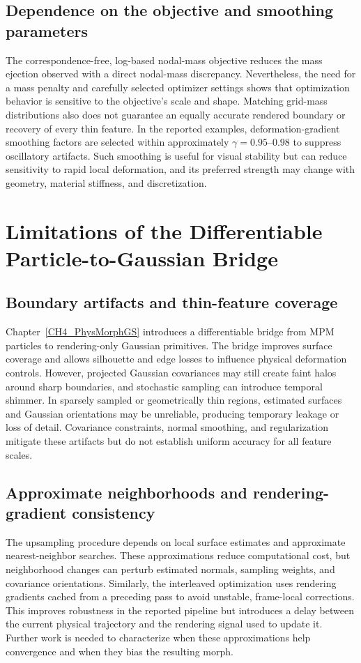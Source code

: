 \subsection{Dependence on the objective and smoothing parameters}
The correspondence-free, log-based nodal-mass objective reduces the mass ejection observed with a direct nodal-mass discrepancy. Nevertheless, the need for a mass penalty and carefully selected optimizer settings shows that optimization behavior is sensitive to the objective's scale and shape. Matching grid-mass distributions also does not guarantee an equally accurate rendered boundary or recovery of every thin feature. In the reported examples, deformation-gradient smoothing factors are selected within approximately $\gamma=0.95$--$0.98$ to suppress oscillatory artifacts. Such smoothing is useful for visual stability but can reduce sensitivity to rapid local deformation, and its preferred strength may change with geometry, material stiffness, and discretization.

\section{Limitations of the Differentiable Particle-to-Gaussian Bridge}
\label{subsec:lim-bridge}

\subsection{Boundary artifacts and thin-feature coverage}
Chapter~\ref{CH4_PhysMorphGS} introduces a differentiable bridge from MPM particles to rendering-only Gaussian primitives. The bridge improves surface coverage and allows silhouette and edge losses to influence physical deformation controls. However, projected Gaussian covariances may still create faint halos around sharp boundaries, and stochastic sampling can introduce temporal shimmer. In sparsely sampled or geometrically thin regions, estimated surfaces and Gaussian orientations may be unreliable, producing temporary leakage or loss of detail. Covariance constraints, normal smoothing, and regularization mitigate these artifacts but do not establish uniform accuracy for all feature scales.

\subsection{Approximate neighborhoods and rendering-gradient consistency}
The upsampling procedure depends on local surface estimates and approximate nearest-neighbor searches. These approximations reduce computational cost, but neighborhood changes can perturb estimated normals, sampling weights, and covariance orientations. Similarly, the interleaved optimization uses rendering gradients cached from a preceding pass to avoid unstable, frame-local corrections. This improves robustness in the reported pipeline but introduces a delay between the current physical trajectory and the rendering signal used to update it. Further work is needed to characterize when these approximations help convergence and when they bias the resulting morph.

